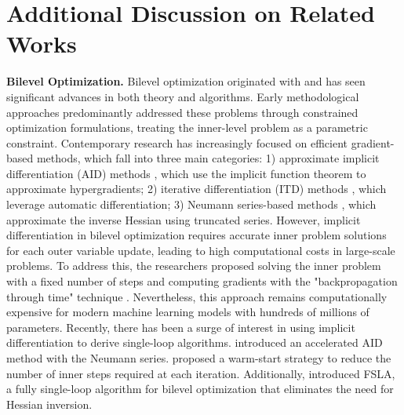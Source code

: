 \documentclass{article}
\theoremstyle{plain}
\theoremstyle{definition}
\theoremstyle{remark}
\begin{document}
\section{Additional Discussion on Related Works}\label{secrelated work}
\textbf{Bilevel Optimization.}
Bilevel optimization originated with \citep{bracken1973mathematical} and has seen significant advances in both theory and algorithms. Early methodological approaches \citep{hansen1992new,shi2005extended} predominantly addressed these problems through constrained optimization formulations, treating the inner-level problem as a parametric constraint.
Contemporary research has increasingly focused on efficient gradient-based methods, which fall into three main categories: 1) approximate implicit differentiation (AID) methods \citep{domke2012generic,liao2018reviving,ji2021bilevel,dagreou2022framework}, which use the implicit function theorem to approximate hypergradients; 2) iterative differentiation (ITD) methods \citep{maclaurin2015gradient,franceschi2018bilevel,grazzi2020iteration}, which leverage automatic differentiation; 3) Neumann series-based methods \citep{ji2021bilevel, yang2021provably}, which approximate the inverse Hessian using truncated series. However, implicit differentiation in bilevel optimization requires accurate inner problem solutions for each outer variable update, leading to high computational costs in large-scale problems. To address this, the researchers proposed solving the inner problem with a fixed number of steps and computing gradients with the "backpropagation through time" technique \citep{shaban2019truncated,franceschi2017forward}. Nevertheless, this approach remains computationally expensive for modern machine learning models with hundreds of millions of parameters. Recently, there has been a surge of interest in using implicit differentiation to derive single-loop algorithms. \citet{ghadimi2018approximation} introduced an accelerated AID method with the Neumann series. \citet{yang2021provably} proposed a warm-start strategy to reduce the number of inner steps required at each iteration. Additionally, \citet{li2022fully} introduced FSLA, a fully single-loop algorithm for bilevel optimization that eliminates the need for Hessian inversion.
\end{document}
